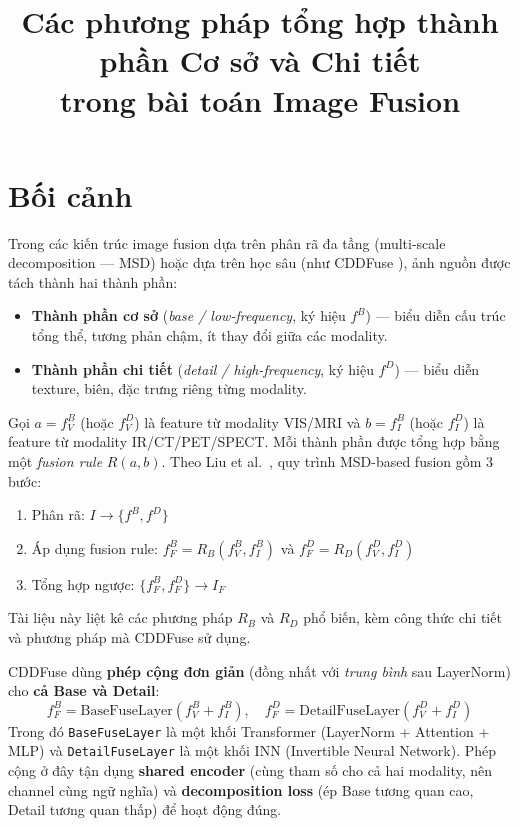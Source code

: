 \documentclass[12pt,a4paper]{article}
\title{Các phương pháp tổng hợp thành phần Cơ sở và Chi tiết\\trong bài toán Image Fusion}
\author{}
\date{}
\begin{document}
\maketitle

\section*{Bối cảnh}

Trong các kiến trúc image fusion dựa trên phân rã đa tầng (multi-scale decomposition --- MSD) hoặc dựa trên học sâu (như CDDFuse \cite{zhao2023cddfuse}), ảnh nguồn được tách thành hai thành phần:
\begin{itemize}\itemsep0pt
    \item \textbf{Thành phần cơ sở} (\emph{base / low-frequency}, ký hiệu $f^B$) --- biểu diễn cấu trúc tổng thể, tương phản chậm, ít thay đổi giữa các modality.
    \item \textbf{Thành phần chi tiết} (\emph{detail / high-frequency}, ký hiệu $f^D$) --- biểu diễn texture, biên, đặc trưng riêng từng modality.
\end{itemize}

Gọi $a = f^B_V$ (hoặc $f^D_V$) là feature từ modality VIS/MRI và $b = f^B_I$ (hoặc $f^D_I$) là feature từ modality IR/CT/PET/SPECT. Mỗi thành phần được tổng hợp bằng một \emph{fusion rule} $R(a, b)$. Theo Liu et al.\ \cite{liu2017survey}, quy trình MSD-based fusion gồm 3 bước:
\begin{enumerate}\itemsep0pt
    \item Phân rã: $I \to \{f^B, f^D\}$
    \item Áp dụng fusion rule: $f^B_F = R_B(f^B_V, f^B_I)$ và $f^D_F = R_D(f^D_V, f^D_I)$
    \item Tổng hợp ngược: $\{f^B_F, f^D_F\} \to I_F$
\end{enumerate}

Tài liệu này liệt kê các phương pháp $R_B$ và $R_D$ phổ biến, kèm công thức chi tiết và phương pháp mà CDDFuse \cite{zhao2023cddfuse} sử dụng.

\begin{tcolorbox}[colback=blue!5,colframe=blue!50,title=\textbf{Phương pháp CDDFuse gốc sử dụng}]
CDDFuse \cite{zhao2023cddfuse} dùng \textbf{phép cộng đơn giản} (đồng nhất với \emph{trung bình} sau LayerNorm) cho \textbf{cả Base và Detail}:
\[
f^B_F = \mathrm{BaseFuseLayer}(f^B_V + f^B_I), \quad
f^D_F = \mathrm{DetailFuseLayer}(f^D_V + f^D_I)
\]
Trong đó \texttt{BaseFuseLayer} là một khối Transformer (LayerNorm + Attention + MLP) và \texttt{DetailFuseLayer} là một khối INN (Invertible Neural Network). Phép cộng ở đây tận dụng \textbf{shared encoder} (cùng tham số cho cả hai modality, nên channel cùng ngữ nghĩa) và \textbf{decomposition loss} (ép Base tương quan cao, Detail tương quan thấp) để hoạt động đúng.
\end{tcolorbox}
\end{document}
